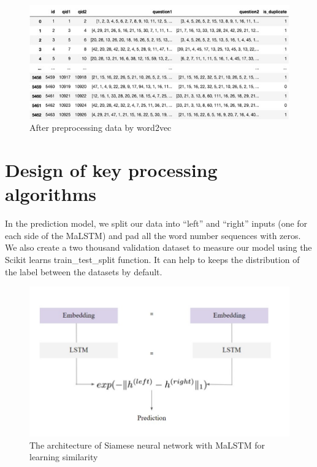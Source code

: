 \documentclass[12pt,oneside,openright,a4paper]{cpe-english-project}
\begin{document}
\begin{figure}[!h]
	\includegraphics[width=14cm]{img/ch3/After preprocessing data by word2vec.jpg}
	\caption{After preprocessing data by word2vec}\label{fig:After preprocessing data by word2vec}
\end{figure}

\section{Design of key processing algorithms}
In the prediction model, we split our data into “left” and “right” inputs (one for each side of the MaLSTM) and pad all the word number sequences with zeros. We also create a two thousand validation dataset to measure our model using the Scikit learns train\_test\_split function. It can help to keeps the distribution of the label between the datasets by default.


\pagebreak

\begin{figure}[!h]
	\includegraphics[width=14cm]{img/ch3/The architecture of Siamese neural network with MaLSTM for learning similarity.jpg}
	\caption{The architecture of Siamese neural network with MaLSTM for learning similarity}\label{fig:The architecture of Siamese neural network with MaLSTM for learning similarity}
\end{figure}
\end{document}
